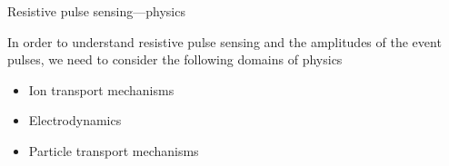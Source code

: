 		



\begin{frame}[c]{Resistive pulse sensing---physics}

	In order to understand resistive pulse sensing and the amplitudes of the event pulses, we need to consider the following domains of physics
	
	\begin{itemize}
		\item Ion transport mechanisms
		\item Electrodynamics
		\item Particle transport mechanisms
	\end{itemize}

\end{frame}






